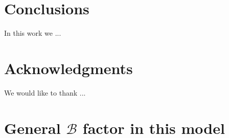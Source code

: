 \documentclass[12pt,letterpaper]{article}
\begin{document}
 
 
 
 
 
 

\section{Conclusions}
\label{sec:conclusions}

In this work we ...


         

 

\section{Acknowledgments}
We would like to thank ...

\appendix

\section{General $\mathcal{B}$ factor in this model}
\label{app:B-factor}
\end{document}
